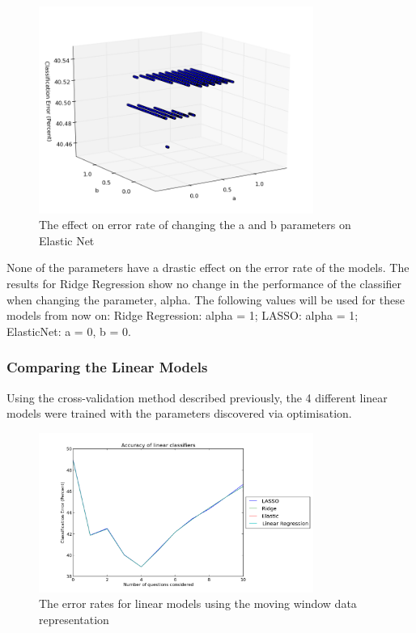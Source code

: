 \begin{figure}[b!]
\centering
\includegraphics[width=0.8\textwidth]{images/elasticnetab.png}
\caption{The effect on error rate of changing the a and b parameters on Elastic Net}
\label{fig:elasticnetab}
\end{figure}

None of the parameters have a drastic effect on the error rate of the models. The results for Ridge Regression show no change in the performance of the classifier when changing the parameter, alpha. The following values will be used for these models from now on: Ridge Regression: alpha = 1; LASSO: alpha = 1; ElasticNet: a = 0, b = 0.

\subsubsection{Comparing the Linear Models}
Using the cross-validation method described previously, the 4 different linear models were trained with the parameters discovered via optimisation.






\begin{figure}[b!]
\centering
\includegraphics[width=0.8\textwidth]{images/linearmodelsmovingwindow.png}
\caption{The error rates for linear models using the moving window data representation}
\label{fig:linearmodelsmovingwindow}
\end{figure}

